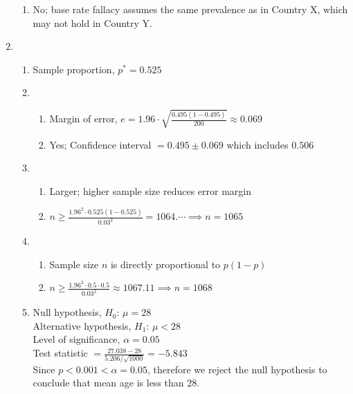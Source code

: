 \documentclass[12pt, a4paper]{article}
\begin{document}
\begin{enumerate}[Q\arabic*.]
\begin{enumerate}[(\alph*.)]
      \item No; base rate fallacy assumes the same prevalence as in Country X, which may not hold in Country Y.
    \end{enumerate}

  \item 
    \begin{enumerate}[(\alph*.)]
      \item Sample proportion, $p^* = 0.525$

      \item 
        \begin{enumerate}[(\roman*.)]
          \item Margin of error, $\displaystyle e = 1.96 \cdot \sqrt{\frac{0.495(1-0.495)}{200}} \approx 0.069$

          \item Yes; Confidence interval $= 0.495 \pm 0.069$ which includes $0.506$
        \end{enumerate}

      \item 
        \begin{enumerate}[(\roman*.)]
          \item Larger; higher sample size reduces error margin

          \item $n \geq \frac{1.96^2 \cdot 0.525(1-0.525)}{0.03^2} = 1064.\cdots \implies n = 1065$
        \end{enumerate}

      \item 
        \begin{enumerate}[(\roman*.)]
          \item Sample size $n$ is directly proportional to $p(1-p)$

          \item $n \geq \frac{1.96^2\cdot 0.5\cdot 0.5}{0.03^2} \approx 1067.11 \implies n = 1068$
        \end{enumerate}

      \item Null hypothesis, $H_0$: $\mu = 28$\\
        Alternative hypothesis, $H_1$: $\mu < 28$\\
        Level of significance, $\alpha = 0.05$\\
        Test statistic $\displaystyle = \frac{27.038 - 28}{5.206 / \sqrt{1000}} = -5.843$\\
        Since $p < 0.001 < \alpha = 0.05$, therefore we reject the null hypothesis to conclude that mean age is less than 28.
    \end{enumerate}

\end{enumerate}
\end{document}
